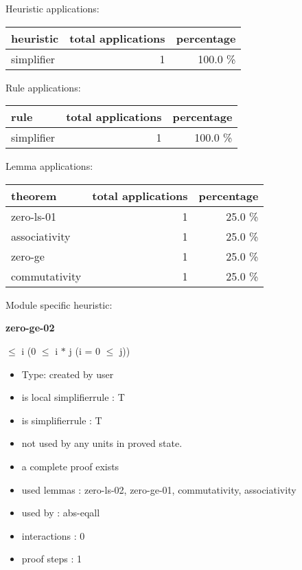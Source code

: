 \documentclass[a4paper]{article}
\begin{document}
\medskip


Heuristic applications:

\begin{supertabular}{l|r|r}
heuristic	& total applications & percentage \\ \hline
simplifier & 1 & 100.0 \% \\

\end{supertabular}

Rule applications:

\begin{supertabular}{l|r|r}
rule	        & total applications & percentage \\ \hline
simplifier & 1 & 100.0 \% \\

\end{supertabular}

Lemma applications:

\begin{supertabular}{l|r|r}
theorem	        & total applications & percentage \\ \hline
zero-ls-01 & 1 & 25.0 \% \\
associativity & 1 & 25.0 \% \\
zero-ge & 1 & 25.0 \% \\
commutativity & 1 & 25.0 \% \\

\end{supertabular}

Module specific heuristic:

\pagebreak

{\LARGE\bf zero-ge-02}\label{lemma-zero-ge-02}

\medskip

  $\le$ i \Imp (0 $\le$ i $*$ j \Equiv \Not \Not (i = 0  $\le$ j))

\begin{itemize}

\item Type: created by user

\item is local simplifierrule : T
\item is simplifierrule : T
\item not used by any units in proved state.
\item       a complete proof exists
\item       used lemmas  : zero-ls-02, zero-ge-01, commutativity, associativity
\item       used by      : abs-eqall
\item       interactions : 0
\item       proof steps  : 1
\end{itemize}
\end{document}
